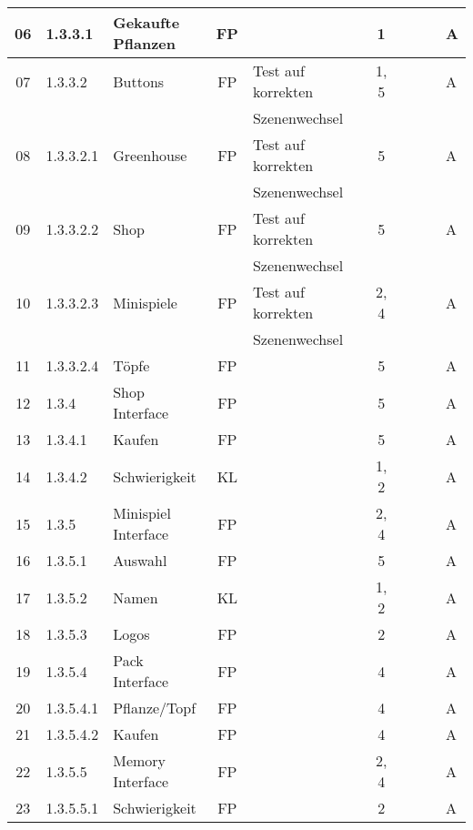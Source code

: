 \begin{table}[H]
\begin{tabular}{|c|l|l|c|l|l|c|c|l|l|l|}
        \hline
        06 & 1.3.3.1 & Gekaufte Pflanzen & FP &  &  & 1 &  &  &  & A \\
        \hline
        07 & 1.3.3.2 & Buttons & FP & Test auf korrekten &  & 1, 5 &  &  &  & A \\
        &       &            &    & Szenenwechsel &   &   & & & &\\
        \hline
        08 & 1.3.3.2.1 & Greenhouse & FP & Test auf korrekten &  & 5 &  &  &  & A \\
        &       &            &    & Szenenwechsel &   &   & & & &\\
        \hline
        09 & 1.3.3.2.2 & Shop & FP & Test auf korrekten &  & 5 &  &  &  & A \\
        &       &            &    & Szenenwechsel &   &   & & & &\\
        \hline
        10 & 1.3.3.2.3 & Minispiele & FP & Test auf korrekten &  & 2, 4 &  &  &  & A \\
        &       &            &    & Szenenwechsel &   &   & & & &\\
        \hline
        11 & 1.3.3.2.4 & Töpfe & FP &  &  & 5 &  &  &  & A \\
        \hline
        12 & 1.3.4 & Shop Interface & FP &  &  & 5 &  &  &  & A \\
        \hline
        13 & 1.3.4.1 & Kaufen & FP &  &  & 5 &  &  &  & A \\
        \hline
        14 & 1.3.4.2 & Schwierigkeit & KL &  &  & 1, 2 &  &  &  & A \\
        \hline
        15 & 1.3.5 & Minispiel Interface & FP &  &  & 2, 4 &  &  &  & A \\
        \hline
        16 & 1.3.5.1 & Auswahl & FP &  &  & 5 &  &  &  & A \\
        \hline
        17 & 1.3.5.2 & Namen & KL &  &  & 1, 2 &  &  &  & A \\
        \hline
        18 & 1.3.5.3 & Logos & FP &  &  & 2 &  &  &  & A \\
        \hline
        19 & 1.3.5.4 & Pack Interface & FP &  &  & 4 &  &  &  & A \\
        \hline
        20 & 1.3.5.4.1 & Pflanze/Topf & FP &  &  & 4 &  &  &  & A \\
        \hline
        21 & 1.3.5.4.2 & Kaufen & FP &  &  & 4 &  &  &  & A \\
        \hline
        22 & 1.3.5.5 & Memory Interface & FP &  &  & 2, 4 &  &  &  & A \\
        \hline
        23 & 1.3.5.5.1 & Schwierigkeit & FP &  &  & 2 &  &  &  & A \\

\end{tabular}
\end{table}

